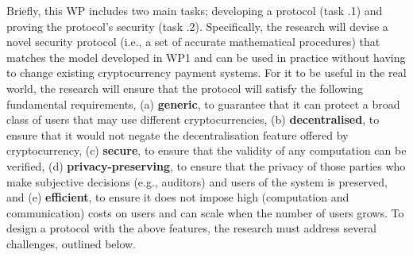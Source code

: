 \vs

\noindent{}

\vs

Briefly, this WP includes two main tasks; developing a protocol (task \2.1) and proving the protocol's security (task \2.2). Specifically, the research will devise a novel security protocol (i.e., a set of accurate mathematical procedures) that matches the model developed in WP1 and can be used in practice without having to change existing cryptocurrency payment systems. For it to be useful in the real world, the research will ensure that the protocol will satisfy the following fundamental requirements, (a) \textbf{generic}, to guarantee that it can protect a broad class of users that may use different cryptocurrencies, (b) \textbf{decentralised}, to ensure that it would not negate the decentralisation feature offered by cryptocurrency, 
%
(c) \textbf{secure}, to ensure that the validity of any computation can be verified,  
%
(d) \textbf{privacy-preserving}, to ensure that the privacy of those parties who make subjective decisions (e.g., auditors) and users of the system is preserved, and 
%
(e) \textbf{efficient},  to ensure it does not impose high (computation and communication) costs on users and can scale when the number of users grows.  
To design a protocol with the above features, the research must address several challenges, outlined below. 


